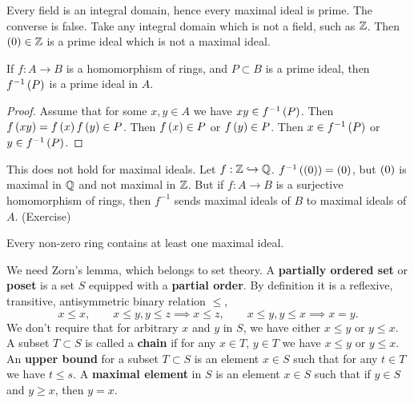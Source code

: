 \begin{remark}
Every field is an integral domain, hence every maximal ideal is prime. The converse is false. Take any integral domain which is not a field, such as $ \mathbb{Z} $. Then $ \left( 0 \right) \in \mathbb{Z} $ is a prime ideal which is not a maximal ideal.
\end{remark}

\begin{proposition}
If $ f : A \to B $ is a homomorphism of rings, and $ P \subset B $ is a prime ideal, then $ f^{-1}\left( P \right) $ is a prime ideal in $ A $.
\end{proposition}

\begin{proof}
Assume that for some $ x, y \in A $ we have $ xy \in f^{-1}\left( P \right) $. Then $ f\left( xy \right) = f\left( x \right)f\left( y \right) \in P $. Then $ f\left( x \right) \in P $ or $ f\left( y \right) \in P $. Then $ x \in f^{-1}\left( P \right) $ or $ y \in f^{-1}\left( P \right) $.
\end{proof}

\begin{remark}
This does not hold for maximal ideals. Let $ f : \mathbb{Z} \hookrightarrow \mathbb{Q} $. $ f^{-1}\left( \left( 0 \right) \right) = \left( 0 \right) $, but $ \left( 0 \right) $ is maximal in $ \mathbb{Q} $ and not maximal in $ \mathbb{Z} $. But if $ f : A \to B $ is a surjective homomorphism of rings, then $ f^{-1} $ sends maximal ideals of $ B $ to maximal ideals of $ A $. (Exercise)
\end{remark}

\begin{theorem}
\label{thm:4.6}
Every non-zero ring contains at least one maximal ideal.
\end{theorem}

We need Zorn's lemma, which belongs to set theory. A \textbf{partially ordered set} or \textbf{poset} is a set $ S $ equipped with a \textbf{partial order}. By definition it is a reflexive, transitive, antisymmetric binary relation $ \le $,
$$ x \le x, \qquad x \le y, y \le z \implies x \le z, \qquad x \le y, y \le x \implies x = y. $$
We don't require that for arbitrary $ x $ and $ y $ in $ S $, we have either $ x \le y $ or $ y \le x $. A subset $ T \subset S $ is called a \textbf{chain} if for any $ x \in T $, $ y \in T $ we have $ x \le y $ or $ y \le x $. An \textbf{upper bound} for a subset $ T \subset S $ is an element $ x \in S $ such that for any $ t \in T $ we have $ t \le s $. A \textbf{maximal element} in $ S $ is an element $ x \in S $ such that if $ y \in S $ and $ y \ge x $, then $ y = x $.


